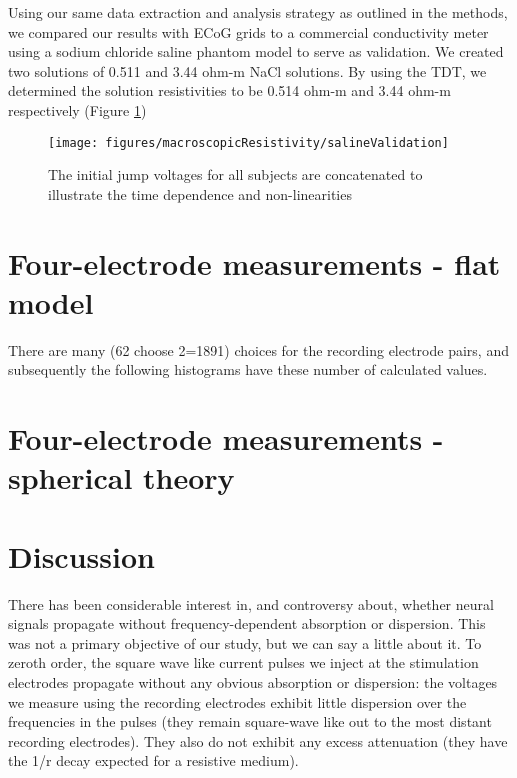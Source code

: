 Using our same data extraction and analysis strategy as outlined in the methods, we compared our results with ECoG grids to a commercial conductivity meter using a sodium chloride saline phantom model to serve as validation. We created two solutions of 0.511 and 3.44 ohm-m NaCl solutions. By using the TDT, we determined the solution resistivities to be 0.514 ohm-m and 3.44 ohm-m respectively (Figure \ref{fig:mrSalineValidation})

\begin{figure}[ht]
	\centering
	\texttt{[image: figures/macroscopicResistivity/salineValidation]}
	\caption[Saline Validation]{The initial jump voltages for all subjects are concatenated to illustrate the time dependence and non-linearities}
	\label{fig:mrSalineValidation}
\end{figure}


\section{Four-electrode measurements - flat model}

There are many (62 choose 2=1891) choices for the recording electrode pairs, and subsequently the following histograms have these number of calculated values.


\section{Four-electrode measurements - spherical theory}

\section{Discussion}

There has been considerable interest in, and controversy about, whether neural signals propagate without  frequency-dependent absorption or dispersion\cite{Miceli2017}. This was not a primary objective of our study, but we can say a little about it. To zeroth order, the square wave like current pulses we inject at the stimulation electrodes propagate without any obvious absorption or dispersion: the voltages we measure using the recording electrodes exhibit little dispersion over the frequencies in the pulses (they remain square-wave like out to the most distant recording electrodes). They also do not exhibit any excess attenuation (they have the 1/r decay expected for a resistive medium).  


